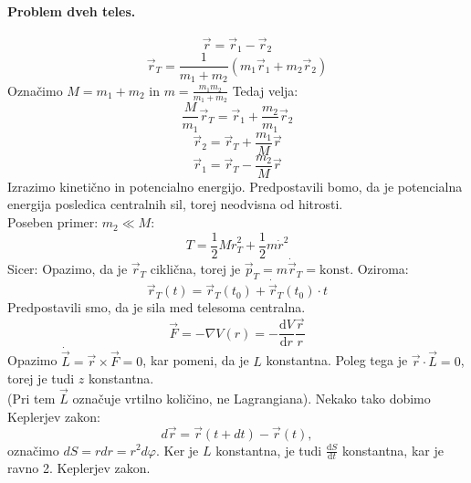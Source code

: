 \documentclass[a4paper]{article}
\newcommand{\vct}[1]{\overrightarrow{#1}}
\newcommand{\dd}[2]{\frac{\mathrm{d} {#1}}{\mathrm{d} {#2}}}
\begin{document}
\paragraph{Problem dveh teles.}
$$\vct{r} = \vct{r}_1 - \vct{r}_2$$
$$\vct{r}_T = \frac{1}{m_1 + m_2}\left(m_1\vct{r}_1 + m_2\vct{r}_2\right)$$
Označimo $M = m_1 + m_2$ in $\displaystyle{m = \frac{m_1m_2}{m_1 + m_2}}$ Tedaj velja:
$$\frac{M}{m_1} \vct{r}_T = \vct{r}_1 + \frac{m_2}{m_1}\vct{r}_2$$
$$\vct{r}_2 = \vct{r}_T + \frac{m_1}{M}\vct{r}$$
$$\vct{r}_1 = \vct{r}_T - \frac{m_2}{M}\vct{r}$$
Izrazimo kinetično in potencialno energijo. Predpostavili bomo, da je potencialna energija posledica centralnih sil, torej neodvisna od hitrosti. \\
Poseben primer: $m_2 \ll M$: $$T = \frac{1}{2}M\dot{r}_T^2 + \frac{1}{2}m\dot{r}^2$$
Sicer:
Opazimo, da je $\vct{r}_T$ ciklična, torej je $\vct{p}_T = m\dot{\vct{r}}_T = \text{konst.}$
Oziroma: $$\vct{r}_T(t) = \vct{r}_T(t_0) + \dot{\vct{r}}_T(t_0)\cdot t$$
Predpostavili smo, da je sila med telesoma centralna.
$$\vct{F} = -\nabla V(r) = - \dd{V}{r}\frac{\vct{r}}{r}$$
Opazimo $\dot{\vct{L}} = \vct{r}\times\vct{F} = 0$, kar pomeni, da je $L$ konstantna. Poleg tega je $\vct{r} \cdot \vct{L} = 0$, torej je tudi $z$ konstantna. \\
(Pri tem $\vct{L}$ označuje vrtilno količino, ne Lagrangiana).
Nekako tako dobimo Keplerjev zakon: $$d\vct{r} = \vct{r}(t+dt) - \vct{r}(t),$$
označimo $dS = rdr = r^2d\varphi$. Ker je $L$ konstantna, je tudi $\displaystyle{\dd{S}{t}}$ konstantna, kar je ravno 2. Keplerjev zakon. \\[4mm]
\end{document}
